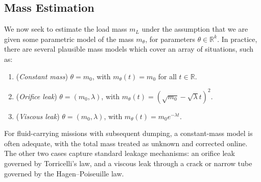 \documentclass[letterpaper, 10 pt, conference]{ieeeconf}  %
\newcommand{\R}{\mathbb{R}}
\begin{document}
\subsection{Mass Estimation}
We now seek to estimate the load mass $m_L$ under the assumption that we are given some parametric model of the mass $m_\theta$, for parameters $\theta \in \R^k$. In practice, there are several plausible mass models which cover an array of situations, such as:
\begin{enumerate}
    \item (\textit{Constant mass}) $\theta = m_0$, with $m_\theta(t) = m_0$ for all $t \in \R$. 
    \item (\textit{Orifice leak}) $\theta = (m_0, \lambda)$, with $m_\theta(t) = (\sqrt{m_0} - \sqrt\lambda t)^2$.
    \item (\textit{Viscous leak}) $\theta = (m_0, \lambda)$, with $m_\theta(t) = m_0 e^{-\lambda t}$.
\end{enumerate}
For fluid-carrying missions with subsequent dumping, a constant-mass model is often adequate, with the total mass treated as unknown and corrected online. The other two cases capture standard leakage mechanisms: an orifice leak governed by Torricelli’s law, and a viscous leak through a crack or narrow tube governed by the Hagen–Poiseuille law.
\end{document}
